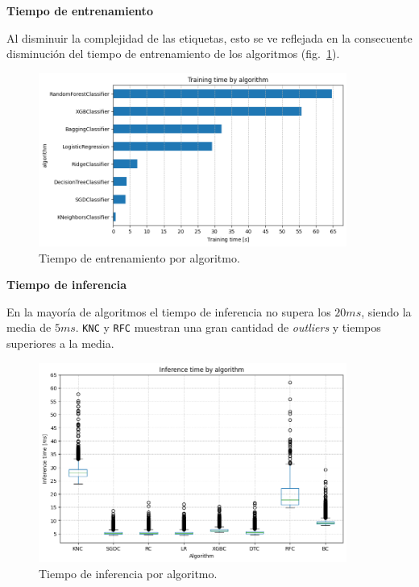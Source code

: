 \documentclass[a4paper,12pt]{article}
\begin{document}
		\textbf{Tiempo de entrenamiento}
				
		Al disminuir la complejidad de las etiquetas, esto se ve reflejada en la consecuente disminución del tiempo de entrenamiento de los algoritmos (fig.~\ref{fig:training_time_uet}).
				
		\begin{figure}[H]
			\begin{center}
				\includegraphics[width=0.9\textwidth]{training_time_uet.png}
				\caption{Tiempo de entrenamiento por algoritmo.}
				\label{fig:training_time_uet}
			\end{center}
		\end{figure}
				
		\textbf{Tiempo de inferencia}
				
		En la mayoría de algoritmos el tiempo de inferencia no supera los $20ms$, siendo la media de $5ms$. \texttt{KNC} y \texttt{RFC} muestran una gran cantidad de \textit{outliers} y tiempos superiores a la media.
				
		\begin{figure}[H]
			\begin{center}
				\includegraphics[width=0.9\textwidth]{inference_time_uet.png}
				\caption{Tiempo de inferencia por algoritmo.}
				\label{fig:inference_time_uet}
			\end{center}
		\end{figure}
				
\end{document}
